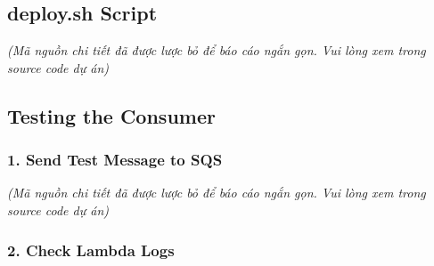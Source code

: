 \begin{Shaded}
\begin{Highlighting}[]
 

\end{Highlighting}
\end{Shaded}

\hypertarget{deploy.sh-script}{%
\subsection{deploy.sh Script}}

\emph{(Mã nguồn chi tiết đã được lược bỏ để báo cáo ngắn gọn. Vui lòng
xem trong source code dự án)}

\hypertarget{testing-the-consumer}{%
\subsection{Testing the Consumer}}

\hypertarget{send-test-message-to-sqs}{%
\subsubsection{1. Send Test Message to
SQS}}

\emph{(Mã nguồn chi tiết đã được lược bỏ để báo cáo ngắn gọn. Vui lòng
xem trong source code dự án)}

\hypertarget{check-lambda-logs}{%
\subsubsection{2. Check Lambda Logs}}

\begin{Shaded}
\begin{Highlighting}[]

\DataTypeTok{\textbackslash{}}
  \DataTypeTok{\textbackslash{}}
   \VariableTok{$(}  \VariableTok{)}\DataTypeTok{\textbackslash{}}
   
\end{Highlighting}
\end{Shaded}

